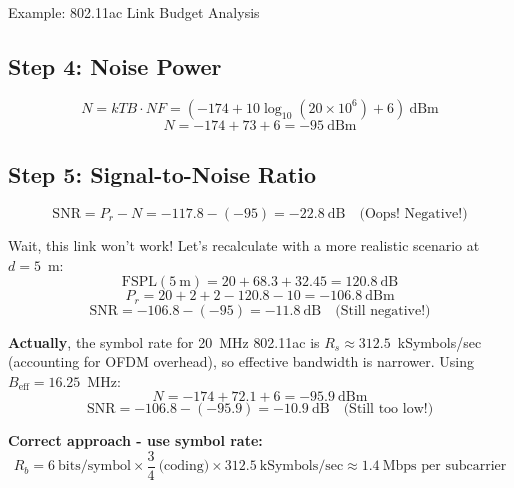 \begin{calloutbox}{Example: 802.11ac Link Budget Analysis}
\subsection*{Step 4: Noise Power}
\begin{equation*}
N = kTB \cdot NF = (-174 + 10\log_{10}(20 \times 10^6) + 6)~\text{dBm}
\end{equation*}
\begin{equation*}
N = -174 + 73 + 6 = -95~\text{dBm}
\end{equation*}

\subsection*{Step 5: Signal-to-Noise Ratio}
\begin{equation*}
\mathrm{SNR} = P_r - N = -117.8 - (-95) = -22.8~\text{dB} \quad \text{(Oops! Negative!)}
\end{equation*}

Wait, this link won't work! Let's recalculate with a more realistic scenario at $d = 5$~m:
\begin{equation*}
\mathrm{FSPL}(5~\text{m}) = 20 + 68.3 + 32.45 = 120.8~\text{dB}
\end{equation*}
\begin{equation*}
P_r = 20 + 2 + 2 - 120.8 - 10 = -106.8~\text{dBm}
\end{equation*}
\begin{equation*}
\mathrm{SNR} = -106.8 - (-95) = -11.8~\text{dB} \quad \text{(Still negative!)}
\end{equation*}

\textbf{Actually}, the symbol rate for 20~MHz 802.11ac is $R_s \approx 312.5$~kSymbols/sec (accounting for OFDM overhead), so effective bandwidth is narrower. Using $B_{\text{eff}} = 16.25$~MHz:
\begin{equation*}
N = -174 + 72.1 + 6 = -95.9~\text{dBm}
\end{equation*}
\begin{equation*}
\mathrm{SNR} = -106.8 - (-95.9) = -10.9~\text{dB} \quad \text{(Still too low!)}
\end{equation*}

\textbf{Correct approach - use symbol rate:}
\begin{equation*}
R_b = 6~\text{bits/symbol} \times \frac{3}{4}~\text{(coding)} \times 312.5~\text{kSymbols/sec} \approx 1.4~\text{Mbps per subcarrier}
\end{equation*}


\end{calloutbox}
